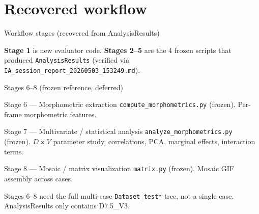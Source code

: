 \documentclass[aspectratio=169]{beamer}
\newcommand{\cmark}{\textcolor{success}{\checkmark}}
\begin{document}
\section{Recovered workflow}

\begin{frame}{Workflow stages (recovered from AnalysisResults)}

\vspace{0.3cm}
\small
\textbf{Stage 1} is new evaluator code. \textbf{Stages 2--5} are the 4 frozen
scripts that produced \texttt{AnalysisResults} (verified via
\texttt{IA\_session\_report\_20260503\_153249.md}).
\end{frame}

\begin{frame}{Stages 6--8 (frozen reference, deferred)}
\begin{block}{Stage 6 --- Morphometric extraction}
\texttt{compute\_morphometrics.py} (frozen). Per-frame morphometric features.
\end{block}
\begin{block}{Stage 7 --- Multivariate / statistical analysis}
\texttt{analyze\_morphometrics.py} (frozen). \(D \times V\) parameter study,
correlations, PCA, marginal effects, interaction terms.
\end{block}
\begin{block}{Stage 8 --- Mosaic / matrix visualization}
\texttt{matrix.py} (frozen). Mosaic GIF assembly across cases.
\end{block}

\textcolor{info}{Stages 6--8 need the full multi-case \texttt{Dataset\_test*}
tree, not a single case. AnalysisResults only contains D7.5\_V3.}
\end{frame}
\end{document}
